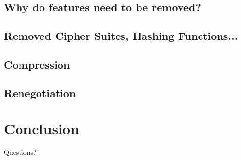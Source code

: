 \documentclass{f4_beamer_metropolis}
\begin{document}
\subsection{Why do features need to be removed?}

\begin{frame}{}

\end{frame}

\subsection{Removed Cipher Suites, Hashing Functions...}

\begin{frame}{}

\end{frame}

\subsection{Compression}

\begin{frame}{}

\end{frame}

\subsection{Renegotiation}

\begin{frame}{}

\end{frame}

\section{Conclusion}

\begin{frame}{}

\end{frame}

\begin{frame}[standout]
  Questions?
\end{frame}
\end{document}
